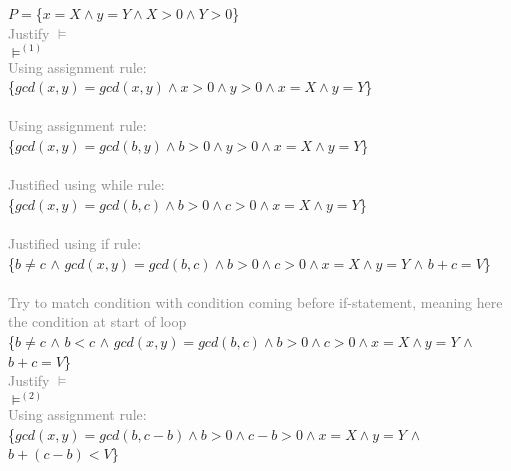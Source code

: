 \documentclass{article}
\begin{document}
\begin{enumerate}
          $P=$\{$x=X \land y=Y\land X > 0 \land Y >0$\}
          \\  \textcolor{gray}{Justify $\vDash$} \\
          $\vDash^{(1)}$ \\
          \textcolor{gray}{Using assignment rule:} \\
          \{$gcd(x,y)=gcd(x,y) \land x >0 \land y > 0 \land x=X \land y=Y$\}
          \\
           \\
          \textcolor{gray}{Using assignment rule:} \\
          \{$gcd(x,y)=gcd(b,y) \land b >0 \land y > 0 \land x=X \land y=Y$\}
          \\
           \\
          \textcolor{gray}{Justified using while rule:} \\
          \{\colorbox{blue!10}{$gcd(x,y)=gcd(b,c) \land b >0 \land c > 0 \land x=X \land y=Y$}\}
          \\
           \\
          \textcolor{gray}{Justified using if rule:} \\
          \{\colorbox{magenta!10}{$b \neq c$} $\land$ \colorbox{blue!10}{$gcd(x,y)=gcd(b,c) \land b >0 \land c > 0 \land x=X \land y=Y$}
          $\land$ \colorbox{teal!10}{$b+c = V$}\}
          \\
           \\
          \textcolor{gray}{Try to match condition with condition coming before if-statement, meaning here the condition at start of loop} \\
          \{\colorbox{magenta!10}{$b \neq c$} $\land$ \colorbox{NavyBlue!10}{$b<c$} $\land$ \colorbox{blue!10}{$gcd(x,y)=gcd(b,c) \land b > 0 \land c > 0 \land x=X \land y=Y$}
          $\land$ \colorbox{teal!10}{$b+c = V$}\}
          \\  \textcolor{gray}{Justify $\vDash$} \\
          $\vDash^{(2)}$ \\
          \textcolor{gray}{Using assignment rule:} \\
          \{$gcd(x,y)=gcd(b,c-b) \land b > 0 \land c-b > 0 \land x=X \land y=Y$ $\land$ \colorbox{teal!10}{$b+(c-b) < V$}\}
          \\
           \\

\end{enumerate}
\end{document}
